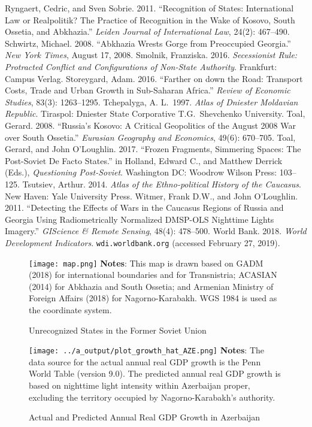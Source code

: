 \documentclass[12pt,a4paper]{article}%
\begin{document}
\begin{thebibliography}{99}
\bibitem{} Ryngaert, Cedric, and Sven Sobrie. 2011. ``Recognition of States: International Law or Realpolitik? The Practice of Recognition in the Wake of Kosovo, South Ossetia, and Abkhazia.'' \textit{Leiden Journal of International Law}, 24(2): 467--490.
\bibitem{} Schwirtz, Michael. 2008. ``Abkhazia Wrests Gorge from Preoccupied Georgia.'' \textit{New York Times}, August 17, 2008.
\bibitem{} Smolnik, Franziska. 2016. \textit{Secessionist Rule: Protracted Conflict and Configurations of Non-State Authority}. Frankfurt: Campus Verlag.
\bibitem{} Storeygard, Adam. 2016. ``Farther on down the Road: Transport Costs, Trade and Urban Growth in Sub-Saharan Africa.'' \textit{Review of Economic Studies}, 83(3): 1263--1295.
\bibitem{} Tchepalyga, A. L.\ 1997. \textit{Atlas of Dniester Moldavian Republic}. Tiraspol: Dniester State Corporative T.G.\ Shevchenko University.
\bibitem{} Toal, Gerard. 2008. ``Russia's Kosovo: A Critical Geopolitics of the August 2008 War over South Ossetia.'' \textit{Eurasian Geography and Economics}, 49(6): 670--705.
\bibitem{} Toal, Gerard, and John O'Loughlin. 2017. ``Frozen Fragments, Simmering Spaces: The Post-Soviet De Facto States.'' in Holland, Edward C., and Matthew Derrick (Eds.), \textit{Questioning Post-Soviet}. Washington DC: Woodrow Wilson Press: 103--125.
\bibitem{} Tsutsiev, Arthur. 2014. \textit{Atlas of the Ethno-political History of the Caucasus}. New Haven: Yale University Press.
\bibitem{} Witmer, Frank D.W., and John O'Loughlin. 2011. ``Detecting the Effects of Wars in the Caucasus Regions of Russia and Georgia Using Radiometrically Normalized DMSP-OLS Nighttime Lights Imagery.'' \textit{GIScience \& Remote Sensing}, 48(4): 478--500.
\bibitem{} World Bank. 2018. \textit{World Development Indicators}. \verb!wdi.worldbank.org! (accessed February 27, 2019).
\end{thebibliography}

\clearpage

\begin{figure}[ptb]
\caption{Unrecognized States in the Former Soviet Union}
\texttt{[image: map.png]}
\label{map}%
{\scriptsize \textbf{Notes}: 
	This map is drawn based on GADM (2018) for international boundaries and for Transnistria; ACASIAN (2014) for Abkhazia and South Ossetia; and Armenian Ministry of Foreign Affairs (2018) for Nagorno-Karabakh. WGS 1984 is used as the coordinate system.
}
\end{figure}

\begin{figure}[ptb]
\caption{Actual and Predicted Annual Real GDP Growth in Azerbaijan}
\texttt{[image: ../a\_output/plot\_growth\_hat\_AZE.png]}
\label{aze}%
{\scriptsize \textbf{Notes}: 
	The data source for the actual annual real GDP growth is the Penn World Table (version 9.0). 
	The predicted annual real GDP growth is based on nighttime light intensity within Azerbaijan proper, excluding the territory occupied by Nagorno-Karabakh's authority. 
}
\end{figure}
\end{document}
